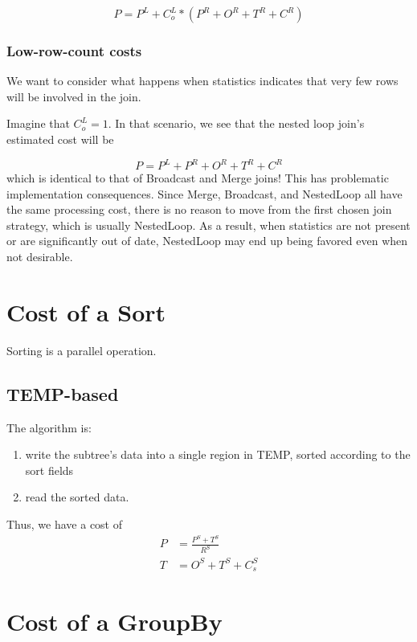 \documentclass[10pt]{amsart}
\begin{document}
\begin{equation}
				P = P^L + C_o^L*(P^R + O^R + T^R + C^R)
\end{equation}

\subsubsection{Low-row-count costs}
We want to consider what happens when statistics indicates that very few rows will be involved in the join. 

Imagine that $C_o^L = 1$. In that scenario, we see that the nested loop join's estimated cost will be

\begin{equation*}
	P = P^L + P^R + O^R + T^R + C^R
\end{equation*}
which is identical to that of Broadcast and Merge joins! This has problematic implementation consequences. Since Merge, Broadcast, and NestedLoop all have the same processing cost, there is no reason to move from the first chosen join strategy, which is usually NestedLoop. As a result, when statistics are not present or are significantly out of date, NestedLoop may end up being favored even when not desirable.


\section{Cost of a Sort}
Sorting is a parallel operation.
\subsection{TEMP-based}
The algorithm is:

\begin{enumerate}
				\item write the subtree's data into a single region in TEMP, sorted according to the sort fields
				\item read the sorted data.
\end{enumerate}

Thus, we have a cost of 
\begin{equation}
				\begin{aligned}
								P &= \frac{P^S +T^S}{R^S} \\
					T &= O^S + T^S + C_s^S
				\end{aligned}
\end{equation}

\section{Cost of a GroupBy}
\end{document}
